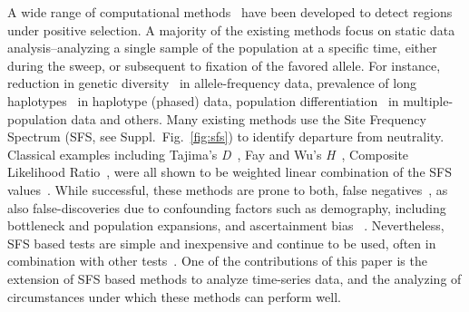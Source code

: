 A wide range of computational methods~\cite{vitti2013detecting} have
been developed to detect regions under positive selection. A majority
of the existing methods focus on static data analysis--analyzing a
single sample of the population at a specific time, either during the
sweep, or subsequent to fixation of the favored allele. For instance,
reduction in genetic
diversity~\cite{tajima1989statistical,fay2000hitchhiking,ronen2013learning}
in allele-frequency data, prevalence of long
haplotypes~\cite{sabeti2006positive,vitti2013detecting} in haplotype
(phased) data, population
differentiation~\cite{holsinger2009genetics,burke2010genome} in
multiple-population data and others. Many existing methods use the
Site Frequency Spectrum (SFS, see Suppl.~Fig.~\ref{fig:sfs}) to
identify departure from neutrality. Classical examples including
Tajima's \emph{D}~\cite{tajima1989statistical}, Fay and Wu's
\emph{H}~\cite{fay2000hitchhiking}, Composite Likelihood
Ratio~\cite{nielsen2005genomic}, were all shown to be weighted linear
combination of the SFS values~\cite{achaz2009frequency}. 
While successful, these methods are prone to both, false
negatives~\cite{messer2013population}, as also false-discoveries due
to confounding factors such as demography, including bottleneck and
population expansions, and ascertainment bias ~\cite{ptak2002evidence,
	ramos2002statistical,akey2009constructing,
	nielsen2003correcting,messer2013population}. Nevertheless, SFS based
tests are simple and inexpensive and continue to be used, often in
combination with other
tests~\cite{akey2009constructing,vitti2013detecting}. One of the
contributions of this paper is the extension of SFS based methods to
analyze time-series data, and the analyzing of circumstances under which
these methods can perform well.

